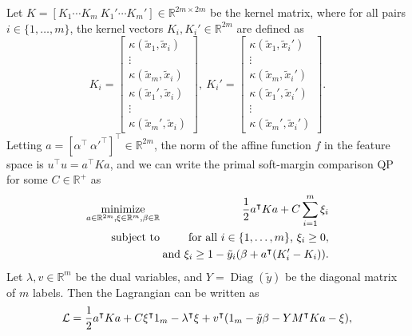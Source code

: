 \documentclass{article}
\newcommand{\RR}{\mathbb R}
\DeclareMathOperator*{\Diag}{Diag}
\DeclareMathOperator*{\minimize}{minimize}
\begin{document}
Let $K=[K_1\cdots K_m\ K_1'\cdots K_m']\in\RR^{2m\times 2m}$ be the
kernel matrix, where for all pairs $i\in\{1, \dots, m\}$, the kernel
vectors $K_i,K_i'\in\RR^{2m}$ are defined as
\begin{equation}
  K_i = \left[
    \begin{array}{c}
      \kappa(\tilde x_1, \tilde x_i)\\
      \vdots\\
      \kappa(\tilde x_m, \tilde x_i)\\
      \kappa(\tilde x_1', \tilde x_i)\\
      \vdots\\
      \kappa(\tilde x_m', \tilde x_i)
    \end{array}
  \right],\ 
  K_i' = \left[
    \begin{array}{c}
      \kappa(\tilde x_1, \tilde x_i')\\
      \vdots\\
      \kappa(\tilde x_m, \tilde x_i')\\
      \kappa(\tilde x_1', \tilde x_i')\\
      \vdots\\
      \kappa(\tilde x_m', \tilde x_i')
    \end{array}
  \right].
\end{equation}
Letting $a=[\alpha^\intercal\
\alpha'^\intercal]^\intercal\in\RR^{2m}$, the norm of the affine
function $f$ in the feature space is $u^\intercal u = a^\intercal K
a$, and we can write the primal soft-margin comparison QP for some
$C\in\RR^+$ as
\begin{eqnarray}
  \minimize_{a\in\RR^{2m},\xi\in\RR^m,\beta\in\RR}\ \ &&\hskip -0.5cm 
  \frac 1 2 a^\intercal K a + C\sum_{i=1}^m \xi_i \\
  \text{subject to}\ \ &&\hskip -0.5cm \nonumber
  \text{for all $i\in\{1,\dots,m\}$, }
  \xi_i \geq 0,\\
  &&\hskip -0.5cm \nonumber \text{and }
  \xi_i \geq 1-\tilde y_i(\beta + a^\intercal (K_i'-K_i)).
\end{eqnarray}
Let $\lambda, v\in\RR^m$ be the dual variables, and $Y=\Diag(\tilde
y)$ be the diagonal matrix of $m$ labels. Then the Lagrangian can be
written as
\begin{equation}
  \label{eq:lagrangian}
  \mathcal L = \frac 1 2 a^\intercal K a + C\xi^\intercal 1_{m}\\
  -\lambda^\intercal \xi + v^\intercal(1_m - \tilde y\beta - Y M^\intercal K a - \xi),
\end{equation}
\end{document}

